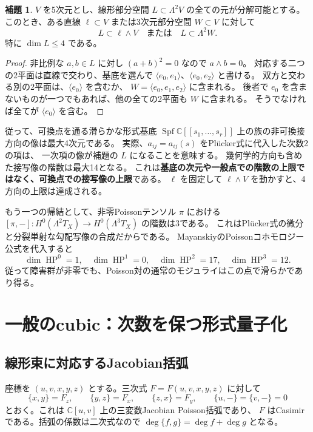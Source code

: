 \documentclass[a4paper,11pt]{ltjsarticle}
\theoremstyle{definition}
\newtheorem{lemma}[theorem]{補題}
\newcommand{\CC}{\mathbb C}
\newcommand{\HP}{\operatorname{HP}}
\newcommand{\Spf}{\operatorname{Spf}}
\begin{document}
\begin{lemma}\label{lem:linear}
$V$ を5次元とし、線形部分空間 $L\subset\Lambda^2V$ の全ての元が分解可能とする。
このとき、ある直線 $\ell\subset V$ または3次元部分空間 $W\subset V$ に対して
\[
 L\subset\ell\wedge V
 \quad\text{または}\quad
 L\subset\Lambda^2W.
\]
特に $\dim L\le4$ である。
\end{lemma}

\begin{proof}
非比例な $a,b\in L$ に対し $(a+b)^2=0$ なので $a\wedge b=0$。
対応する二つの2平面は直線で交わり、基底を選んで
$\langle e_0,e_1\rangle$、$\langle e_0,e_2\rangle$ と書ける。
双方と交わる別の2平面は、$\langle e_0\rangle$ を含むか、
$W=\langle e_0,e_1,e_2\rangle$ に含まれる。
後者で $e_0$ を含まないものが一つでもあれば、他の全ての2平面も $W$ に含まれる。
そうでなければ全てが $\langle e_0\rangle$ を含む。
\end{proof}

従って、可換点を通る滑らかな形式基底
$\Spf\CC[[s_1,\ldots,s_r]]$ 上の族の非可換接方向の像は最大4次元である。
実際、$a_{ij}=a_{ij}(s)$ をPlücker式に代入した次数2の項は、
一次項の像が補題の $L$ になることを意味する。
幾何学的方向も含めた接写像の階数は最大14となる。
これは\textbf{基底の次元や一般点での階数の上限ではなく、可換点での接写像の上限}である。
$\ell$ を固定して $\ell\wedge V$ を動かすと、4方向の上限は達成される。

もう一つの帰結として、非零Poissonテンソル $\pi$ における
$[\pi,-]:H^0(\Lambda^2T_X)\to H^0(\Lambda^3T_X)$ の階数は3である。
これはPlücker式の微分と分裂単射な勾配写像の合成だからである。
MayanskiyのPoissonコホモロジー公式\cite[Theorem 2]{May}を代入すると
\[
 \dim\HP^0=1,\quad \dim\HP^1=0,\quad
 \dim\HP^2=17,\quad \dim\HP^3=12.
\]
従って障害群が非零でも、Poisson対の通常のモジュライはこの点で滑らかであり得る。

\section{一般のcubic：次数を保つ形式量子化}

\subsection{線形束に対応するJacobian括弧}

座標を $(u,v,x,y,z)$ とする。三次式 $F=F(u,v,x,y,z)$ に対して
\begin{equation}\label{eq:jac}
 \{x,y\}=F_z,\qquad \{y,z\}=F_x,\qquad \{z,x\}=F_y,
 \qquad \{u,-\}=\{v,-\}=0
\end{equation}
とおく。これは $\CC[u,v]$ 上の三変数Jacobian Poisson括弧であり、
$F$ はCasimirである。括弧の係数は二次式なので
$\deg\{f,g\}=\deg f+\deg g$ となる。
\end{document}
